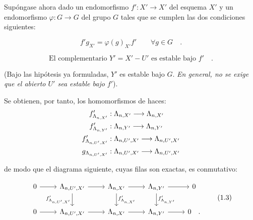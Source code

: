 Supóngase ahora dado un endomorfismo $f' : X' \to X'$ del esquema $X'$ y un endomorfismo $\varphi : G \to G$ del grupo $G$ tales que se cumplen las dos condiciones siguientes:

\begin{equation}\tag{1.1}
f' g_{X'} = \varphi(g)_{X'} f' \qquad \forall g \in G \quad .
\end{equation}

\begin{equation}\tag{1.2}
\text{El complementario } Y' = X' - U' \text{ es estable bajo } f' \quad .
\end{equation}

(Bajo las hipótesis ya formuladas, $Y'$ es estable bajo $G$. \emph{En general, no se exige que el abierto $U'$ sea estable bajo $f'$}).

Se obtienen, por tanto, los homomorfismos de haces:
\begin{align*}
f'_{\Lambda_{n,X'}} &: \Lambda_{n,X'} \longrightarrow \Lambda_{n,X'} \\
f'_{\Lambda_{n,Y'}} &: \Lambda_{n,Y'} \longrightarrow \Lambda_{n,Y'} \\
f'_{\Lambda_{n,U',X'}} &: \Lambda_{n,U',X'} \longrightarrow \Lambda_{n,U',X'} \\
g_{\Lambda_{n,U',X'}} &: \Lambda_{n,U',X'} \longrightarrow \Lambda_{n,U',X'}
\end{align*}

de modo que el diagrama siguiente, cuyas filas son exactas, es conmutativo:

\[
\begin{tikzcd}
0 \arrow[r] & \La_{n,U',X'} \arrow[r] \arrow[d, "f'_{\La_{n,U',X'}}"'] & \La_{n,X'} \arrow[r] \arrow[d, "f'_{\La_{n,X'}}"] & \La_{n,Y'} \arrow[r] \arrow[d, "f'_{\La_{n,Y'}}"] & 0 \\
0 \arrow[r] & \La_{n,U',X'} \arrow[r] & \La_{n,X'} \arrow[r] & \La_{n,Y'} \arrow[r] & 0 \quad .
\end{tikzcd}
\tag{1.3}
\]
